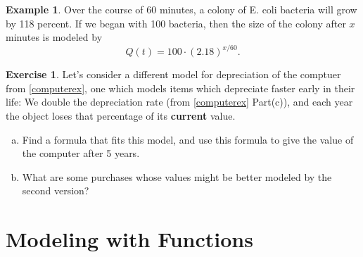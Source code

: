 \documentclass[11pt,reqno,final]{amsart}
\numberwithin{equation}{section}
\numberwithin{figure}{section}
\theoremstyle{definition} %
\newtheorem*{example*}{Example}%
\newtheorem{exercise}[question]{Exercise}
\begin{document}
\begin{example*}
        Over the course of 60 minutes, a colony of E. coli bacteria will grow by 118 percent.
        If we began with 100 bacteria, then the size of the colony after $x$ minutes is modeled by
        \[
                Q(t) = 100 \cdot (2.18)^{x/60}.
        \]
\end{example*}

\begin{exercise}
        Let's consider a different model for depreciation of the comptuer from \cref{computerex},
        one which models items which depreciate faster early in their life:
        We double the depreciation rate (from \cref{computerex} Part(c)), and each year the object loses that percentage of its \textbf{current} value.
        \begin{enumerate}[(a)]
        \item Find a formula that fits this model, and
                use this formula to give the value of the computer after 5 years.
                \vfill
                \vfill
        \item What are some purchases whose values might be better modeled by the second version?
                \vfill
        \end{enumerate}        
\end{exercise}


\newpage




\section{Modeling with Functions}
\end{document}

